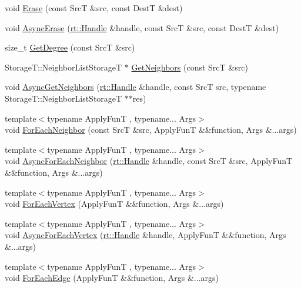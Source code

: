 \begin{DoxyCompactItemize}
\item 
void \hyperlink{classshad_1_1LocalEdgeIndex_a38d8494cb63e586ca9dac7292f44ebbd}{Erase} (const Src\-T \&src, const Dest\-T \&dest)
\item 
void \hyperlink{classshad_1_1LocalEdgeIndex_a35184fe1fca993a734db0c93193618af}{Async\-Erase} (\hyperlink{classshad_1_1rt_1_1Handle}{rt\-::\-Handle} \&handle, const Src\-T \&src, const Dest\-T \&dest)
\item 
size\-\_\-t \hyperlink{classshad_1_1LocalEdgeIndex_a717d3f76acbd4a0e067320147a58b3ed}{Get\-Degree} (const Src\-T \&src)
\item 
Storage\-T\-::\-Neighbor\-List\-Storage\-T $\ast$ \hyperlink{classshad_1_1LocalEdgeIndex_a28afcf83ba63b4ecdda8677a5530a92d}{Get\-Neighbors} (const Src\-T \&src)
\item 
void \hyperlink{classshad_1_1LocalEdgeIndex_a9ce53de04913929d320d21602c4e3d32}{Async\-Get\-Neighbors} (\hyperlink{classshad_1_1rt_1_1Handle}{rt\-::\-Handle} \&handle, const Src\-T src, typename Storage\-T\-::\-Neighbor\-List\-Storage\-T $\ast$$\ast$res)
\item 
{\footnotesize template$<$typename Apply\-Fun\-T , typename... Args$>$ }\\void \hyperlink{classshad_1_1LocalEdgeIndex_ad486a61517a2d23d56e9b7fb52a629a8}{For\-Each\-Neighbor} (const Src\-T \&src, Apply\-Fun\-T \&\&function, Args \&...args)
\item 
{\footnotesize template$<$typename Apply\-Fun\-T , typename... Args$>$ }\\void \hyperlink{classshad_1_1LocalEdgeIndex_ac124fa2ec236e180846f37533f80f9cc}{Async\-For\-Each\-Neighbor} (\hyperlink{classshad_1_1rt_1_1Handle}{rt\-::\-Handle} \&handle, const Src\-T \&src, Apply\-Fun\-T \&\&function, Args \&...args)
\item 
{\footnotesize template$<$typename Apply\-Fun\-T , typename... Args$>$ }\\void \hyperlink{classshad_1_1LocalEdgeIndex_a938704c5b44b11ff7361fec41b667d30}{For\-Each\-Vertex} (Apply\-Fun\-T \&\&function, Args \&...args)
\item 
{\footnotesize template$<$typename Apply\-Fun\-T , typename... Args$>$ }\\void \hyperlink{classshad_1_1LocalEdgeIndex_aa4db6d4916d982d6d87a615a5d46ba0b}{Async\-For\-Each\-Vertex} (\hyperlink{classshad_1_1rt_1_1Handle}{rt\-::\-Handle} \&handle, Apply\-Fun\-T \&\&function, Args \&...args)
\item 
{\footnotesize template$<$typename Apply\-Fun\-T , typename... Args$>$ }\\void \hyperlink{classshad_1_1LocalEdgeIndex_aa906c7042fc7c126f402e5c420c85f45}{For\-Each\-Edge} (Apply\-Fun\-T \&\&function, Args \&...args)
$$
\end{DoxyCompactItemize}
